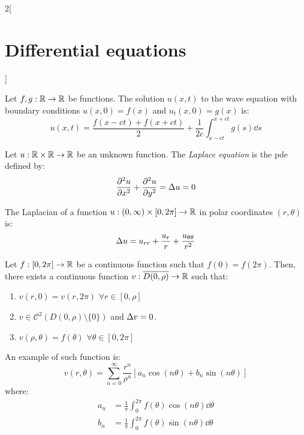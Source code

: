 \documentclass[../../../main_math.tex]{subfiles}
\begin{document}
\begin{multicols}{2}[\section{Differential equations}]
\begin{proposition}
    Let $f,g:\mathbb{R}\rightarrow\mathbb{R}$ be functions. The solution $u(x,t)$ to the wave equation with boundary conditions $u(x,0)=f(x)$ and $u_t(x,0)=g(x)$ is: $$u(x,t)=\frac{f(x-ct)+f(x+ct)}{2}+\frac{1}{2c}\int_{x-ct}^{x+ct}g(s)\dd{s}$$
  \end{proposition}
  \begin{definition}
    Let $u:\mathbb{R}\times\mathbb{R}\rightarrow\mathbb{R}$ be an unknown function. The \emph{Laplace equation} is the pde defined by: $$\pdv[2]{u}{x}+\pdv[2]{u}{y}=\Delta u=0$$
  \end{definition}
  \begin{proposition}
    The Laplacian of a function $u:(0,\infty)\times[0,2\pi]\rightarrow\mathbb{R}$ in polar coordinates $(r,\theta)$ is: $$\Delta u=u_{rr}+\frac{u_r}{r}+\frac{u_{\theta\theta}}{r^2}$$
  \end{proposition}
  \begin{proposition}
    Let $f:[0,2\pi]\rightarrow\mathbb{R}$ be a continuous function such that $f(0)=f(2\pi)$. Then, there exists a continuous function $v:\overline{D(0,\rho)}\rightarrow\mathbb{R}$ such that:
    \begin{enumerate}
      \item $v(r,0)=v(r,2\pi)$ $\forall r\in[0,\rho]$
      \item $v\in\mathcal{C}^2(D(0,\rho)\setminus\{0\})$ and $\Delta v=0$.
      \item $v(\rho,\theta)=f(\theta)$ $\forall\theta\in[0,2\pi]$
    \end{enumerate}
    An example of such function is:
    $$v(r,\theta)=\sum_{n=0}^\infty \frac{r^n}{\rho^n}\left[a_n\cos\left(n\theta\right)+ b_n\sin\left(n\theta\right)\right]$$ where:
    \begin{align*}
      a_n & =\frac{1}{\pi}\int_{0}^{2\pi} f(\theta)\cos\left(n\theta\right)\dd{\theta} \\
      b_n & =\frac{1}{\pi}\int_{0}^{2\pi} f(\theta)\sin\left(n\theta\right)\dd{\theta}
    \end{align*}
  \end{proposition}
\end{multicols}
\end{document}
